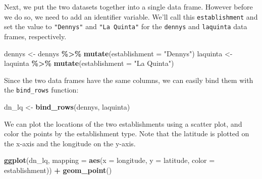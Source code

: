 \documentclass[
]{article}
\newenvironment{Shaded}{\begin{snugshade}}{\end{snugshade}}
\newcommand{\AttributeTok}[1]{\textcolor[rgb]{0.13,0.29,0.53}{#1}}
\newcommand{\FunctionTok}[1]{\textcolor[rgb]{0.13,0.29,0.53}{\textbf{#1}}}
\newcommand{\NormalTok}[1]{#1}
\newcommand{\OtherTok}[1]{\textcolor[rgb]{0.56,0.35,0.01}{#1}}
\newcommand{\SpecialCharTok}[1]{\textcolor[rgb]{0.81,0.36,0.00}{\textbf{#1}}}
\newcommand{\StringTok}[1]{\textcolor[rgb]{0.31,0.60,0.02}{#1}}
\begin{document}
Next, we put the two datasets together into a single data frame. However
before we do so, we need to add an identifier variable. We'll call this
\texttt{establishment} and set the value to
\texttt{"Denny\textquotesingle{}s"} and \texttt{"La\ Quinta"} for the
\texttt{dennys} and \texttt{laquinta} data frames, respectively.

\begin{Shaded}
\begin{Highlighting}[]
\NormalTok{dennys }\OtherTok{\textless{}{-}}\NormalTok{ dennys }\SpecialCharTok{\%\textgreater{}\%}
  \FunctionTok{mutate}\NormalTok{(}\AttributeTok{establishment =} \StringTok{"Denny\textquotesingle{}s"}\NormalTok{)}
\NormalTok{laquinta }\OtherTok{\textless{}{-}}\NormalTok{ laquinta }\SpecialCharTok{\%\textgreater{}\%}
  \FunctionTok{mutate}\NormalTok{(}\AttributeTok{establishment =} \StringTok{"La Quinta"}\NormalTok{)}
\end{Highlighting}
\end{Shaded}

Since the two data frames have the same columns, we can easily bind them
with the \texttt{bind\_rows} function:

\begin{Shaded}
\begin{Highlighting}[]
\NormalTok{dn\_lq }\OtherTok{\textless{}{-}} \FunctionTok{bind\_rows}\NormalTok{(dennys, laquinta)}
\end{Highlighting}
\end{Shaded}

We can plot the locations of the two establishments using a scatter
plot, and color the points by the establishment type. Note that the
latitude is plotted on the x-axis and the longitude on the y-axis.

\begin{Shaded}
\begin{Highlighting}[]
\FunctionTok{ggplot}\NormalTok{(dn\_lq, }\AttributeTok{mapping =} \FunctionTok{aes}\NormalTok{(}\AttributeTok{x =}\NormalTok{ longitude,}
                            \AttributeTok{y =}\NormalTok{ latitude,}
                            \AttributeTok{color =}\NormalTok{ establishment)) }\SpecialCharTok{+}
  \FunctionTok{geom\_point}\NormalTok{()}
\end{Highlighting}
\end{Shaded}
\end{document}
